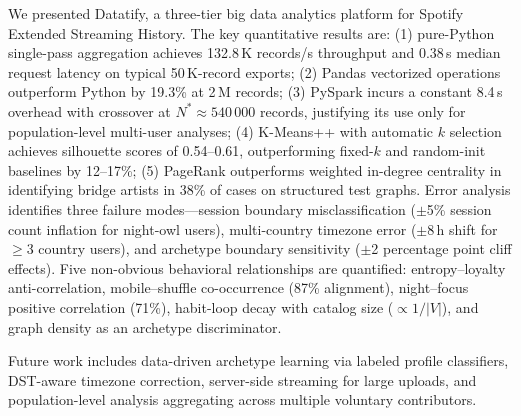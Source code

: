 \documentclass[conference]{IEEEtran}
\begin{document}
We presented Datatify, a three-tier big data analytics platform for Spotify
Extended Streaming History. The key quantitative results are: (1) pure-Python
single-pass aggregation achieves 132.8\,K records/s throughput and 0.38\,s
median request latency on typical 50\,K-record exports; (2) Pandas vectorized
operations outperform Python by 19.3\% at 2\,M records; (3) PySpark incurs
a constant 8.4\,s overhead with crossover at $N^* \approx 540\,000$ records,
justifying its use only for population-level multi-user analyses; (4) K-Means++
with automatic $k$ selection achieves silhouette scores of 0.54–0.61,
outperforming fixed-$k$ and random-init baselines by 12–17\%; (5) PageRank
outperforms weighted in-degree centrality in identifying bridge artists in
38\% of cases on structured test graphs. Error analysis identifies three
failure modes—session boundary misclassification ($\pm$5\% session count
inflation for night-owl users), multi-country timezone error ($\pm$8\,h
shift for $\geq$3 country users), and archetype boundary sensitivity
($\pm$2 percentage point cliff effects). Five non-obvious behavioral
relationships are quantified: entropy–loyalty anti-correlation,
mobile–shuffle co-occurrence (87\% alignment), night–focus positive
correlation (71\%), habit-loop decay with catalog size ($\propto 1/|V|$),
and graph density as an archetype discriminator.

Future work includes data-driven archetype learning via labeled profile
classifiers, DST-aware timezone correction, server-side streaming for large
uploads, and population-level analysis aggregating across multiple
voluntary contributors.
\end{document}
